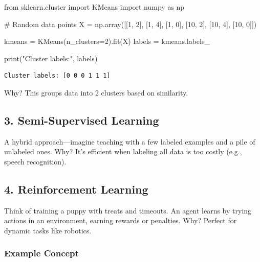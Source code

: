 \documentclass[
  letterpaper,
  DIV=11,
  numbers=noendperiod]{scrreprt}
\newenvironment{Shaded}{\begin{snugshade}}{\end{snugshade}}
\newcommand{\BuiltInTok}[1]{\textcolor[rgb]{0.00,0.23,0.31}{#1}}
\newcommand{\CommentTok}[1]{\textcolor[rgb]{0.37,0.37,0.37}{#1}}
\newcommand{\DecValTok}[1]{\textcolor[rgb]{0.68,0.00,0.00}{#1}}
\newcommand{\ImportTok}[1]{\textcolor[rgb]{0.00,0.46,0.62}{#1}}
\newcommand{\NormalTok}[1]{\textcolor[rgb]{0.00,0.23,0.31}{#1}}
\newcommand{\OperatorTok}[1]{\textcolor[rgb]{0.37,0.37,0.37}{#1}}
\newcommand{\StringTok}[1]{\textcolor[rgb]{0.13,0.47,0.30}{#1}}
\begin{document}
\begin{Shaded}
\begin{Highlighting}[]
\ImportTok{from}\NormalTok{ sklearn.cluster }\ImportTok{import}\NormalTok{ KMeans}
\ImportTok{import}\NormalTok{ numpy }\ImportTok{as}\NormalTok{ np}

\CommentTok{\# Random data points}
\NormalTok{X }\OperatorTok{=}\NormalTok{ np.array([[}\DecValTok{1}\NormalTok{, }\DecValTok{2}\NormalTok{], [}\DecValTok{1}\NormalTok{, }\DecValTok{4}\NormalTok{], [}\DecValTok{1}\NormalTok{, }\DecValTok{0}\NormalTok{], [}\DecValTok{10}\NormalTok{, }\DecValTok{2}\NormalTok{], [}\DecValTok{10}\NormalTok{, }\DecValTok{4}\NormalTok{], [}\DecValTok{10}\NormalTok{, }\DecValTok{0}\NormalTok{]])}

\NormalTok{kmeans }\OperatorTok{=}\NormalTok{ KMeans(n\_clusters}\OperatorTok{=}\DecValTok{2}\NormalTok{).fit(X)}
\NormalTok{labels }\OperatorTok{=}\NormalTok{ kmeans.labels\_}

\BuiltInTok{print}\NormalTok{(}\StringTok{"Cluster labels:"}\NormalTok{, labels)}
\end{Highlighting}
\end{Shaded}

\begin{verbatim}
Cluster labels: [0 0 0 1 1 1]
\end{verbatim}

Why? This groups data into 2 clusters based on similarity.

\subsection{3. Semi-Supervised Learning}\label{semi-supervised-learning}

A hybrid approach---imagine teaching with a few labeled examples and a
pile of unlabeled ones. Why? It's efficient when labeling all data is
too costly (e.g., speech recognition).

\subsection{4. Reinforcement Learning}\label{reinforcement-learning}

Think of training a puppy with treats and timeouts. An agent learns by
trying actions in an environment, earning rewards or penalties. Why?
Perfect for dynamic tasks like robotics.

\subsubsection{Example Concept}\label{example-concept}
\end{document}
